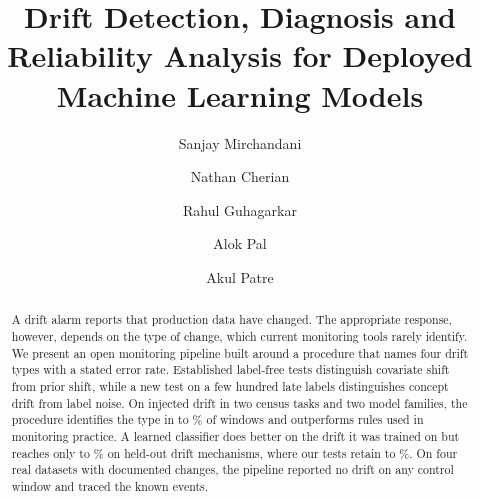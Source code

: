 \documentclass[10pt]{article}
\newif\ifanonymous
\begin{document}
\begin{opening}

\title{Drift Detection, Diagnosis and Reliability Analysis for Deployed Machine Learning Models}

\ifanonymous
\author[Affiliations withheld for double-blind review]{Anonymous authors}
\else
\author[Department of Computer Engineering, V.E.S. Institute of Technology, Mumbai, India,
        e-mail: \URL{sanjay.mirchandani@ves.ac.in}]{Sanjay Mirchandani}
\author[Department of Computer Engineering, V.E.S. Institute of Technology, Mumbai, India,
        e-mail: \URL{2023.nathan.cherian@ves.ac.in}]{Nathan Cherian}
\author[Department of Computer Engineering, V.E.S. Institute of Technology, Mumbai, India,
        e-mail: \URL{2023.rahul.guhagarkar@ves.ac.in}]{Rahul Guhagarkar}
\author[Department of Computer Engineering, V.E.S. Institute of Technology, Mumbai, India,
        e-mail: \URL{2023.alok.pal@ves.ac.in}]{Alok Pal}
\author[Department of Computer Engineering, V.E.S. Institute of Technology, Mumbai, India,
        e-mail: \URL{2023.akul.patre@ves.ac.in}]{Akul Patre}
\fi

\begin{abstract}
A drift alarm reports that production data have changed. The appropriate response, however, depends on the type of change, which current monitoring tools rarely identify. We present an open monitoring pipeline built around a procedure that names four drift types with a stated error rate. Established label-free tests distinguish covariate shift from prior shift, while a new test on a few hundred late labels distinguishes concept drift from label noise. On injected drift in two census tasks and two model families, the procedure identifies the type in  to \% of windows and outperforms rules used in monitoring practice. A learned classifier does better on the drift it was trained on but reaches only  to \% on held-out drift mechanisms, where our tests retain  to \%. On four real datasets with documented changes, the pipeline reported no drift on any control window and traced the known events.
\end{abstract}


\end{opening}
\end{document}
